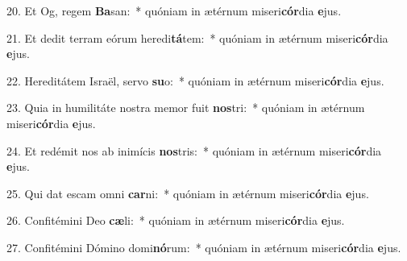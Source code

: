 20. Et Og, regem \textbf{Ba}san:~*  quóniam in ætérnum miseri\textbf{cór}dia \textbf{e}jus.\

21. Et dedit terram eórum heredi\textbf{tá}tem:~*  quóniam in ætérnum miseri\textbf{cór}dia \textbf{e}jus.\

22. Hereditátem Israël, servo \textbf{su}o:~*  quóniam in ætérnum miseri\textbf{cór}dia \textbf{e}jus.\

23. Quia in humilitáte nostra memor fuit \textbf{nos}tri:~*  quóniam in ætérnum miseri\textbf{cór}dia \textbf{e}jus.\

24. Et redémit nos ab inimícis \textbf{nos}tris:~*  quóniam in ætérnum miseri\textbf{cór}dia \textbf{e}jus.\

25. Qui dat escam omni \textbf{car}ni:~*  quóniam in ætérnum miseri\textbf{cór}dia \textbf{e}jus.\

26. Confitémini Deo \textbf{cæ}li:~*  quóniam in ætérnum miseri\textbf{cór}dia \textbf{e}jus.\

27. Confitémini Dómino domi\textbf{nó}rum:~*  quóniam in ætérnum miseri\textbf{cór}dia \textbf{e}jus.\

